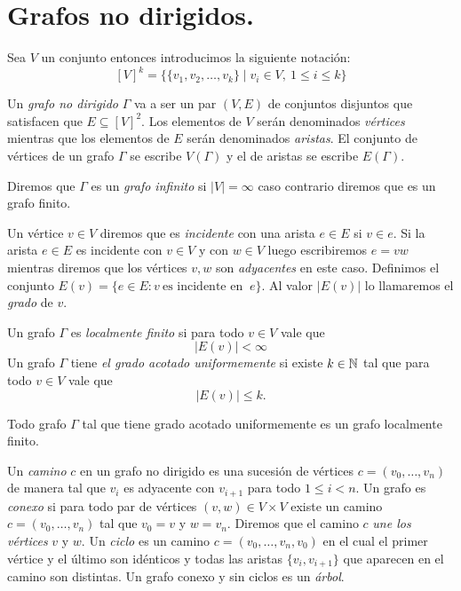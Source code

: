 \documentclass[tesis.tex]{subfiles}
\begin{document}
\section{Grafos no dirigidos.}\label{secc_graf_nd}

Sea $V$ un conjunto entonces introducimos la siguiente notación:
\[
	[V]^k = \{ \{ v_1, v_2, \dots, v_{k} \} \mid v_{i} \in V, \ 1 \le i \le k \}
\]

\begin{deff}
	Un \emph{grafo no dirigido} $\Gamma$ va a ser un par $(V,E)$ de conjuntos disjuntos que satisfacen que
	$E \subseteq [V]^2$.
	Los elementos de $V$ serán denominados \emph{vértices} mientras que los elementos de $E$ serán denominados \emph{aristas}.
	El conjunto de vértices de un grafo $\Gamma$ se escribe $V(\Gamma)$ y el de aristas se escribe $E(\Gamma)$.
\end{deff}


Diremos que $\Gamma$ es un \emph{grafo infinito} si $|V| = \infty$ caso contrario diremos que es un grafo finito.

Un vértice $v \in V$ diremos que es \emph{incidente} con una arista $e \in E$ si $v \in e$.
Si la arista $e \in E$ es incidente con $v \in V$ y con $w \in V$ luego escribiremos $e = vw$ mientras diremos que los vértices $v,w$ son \emph{adyacentes} en este caso.
Definimos el conjunto $E(v) = \{  e \in E : v \ \text{es incidente en } \ e \}$.
Al valor $|E(v)|$ lo llamaremos el \emph{grado} de $v$.


\begin{deff}
	Un grafo $\Gamma$ es \emph{localmente finito} si para todo $v \in V$ vale que
	\[
		| E(v) | < \infty
	\]
	Un grafo $\Gamma$ tiene \emph{el grado acotado uniformemente} si existe $k \in \mathbb{N}$ tal que para todo $v \in V$ vale que 
	\[
		|E(v)| \le k.
	\]
\end{deff}
\begin{obs}
	Todo grafo $\Gamma$ tal que tiene grado acotado uniformemente es un grafo localmente finito.
\end{obs}

Un \emph{camino} $c$ en un grafo no dirigido es una sucesión de vértices $c=(v_{0}, \dots, v_{n})$ de manera tal que $v_{i}$ es adyacente con $v_{i+1}$ para todo $1 \le i < n$.
Un grafo es \emph{conexo} si para todo par de vértices $(v,w) \in V \times V$ existe un camino $c = (v_{0}, \dots, v_{n})$ tal que $v_{0} = v$ y $w=v_{n}$.
Diremos que el camino $c$ \emph{une los vértices} $v$ y $w$.
Un \emph{ciclo} es un camino $c = (v_{0}, \dots, v_{n}, v_{0})$ en el cual el primer vértice y el último son idénticos y todas las aristas $\{ v_{i}, v_{i+1} \}$ que aparecen en el camino son distintas.
Un grafo conexo y sin ciclos es un \emph{árbol}.
\end{document}
